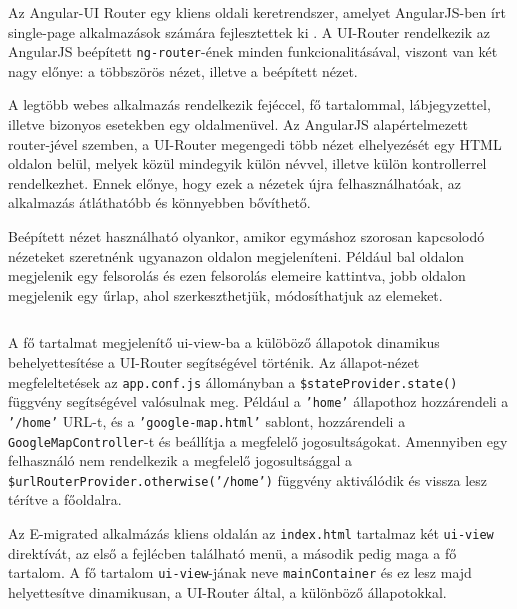 Az Angular-UI Router egy kliens oldali keretrendszer, amelyet AngularJS-ben írt single-page alkalmazások számára fejlesztettek ki \cite{uirouter}. A UI-Router rendelkezik az AngularJS beépített \texttt{ng-router}-ének minden funkcionalitásával, viszont van két nagy előnye: a többszörös nézet, illetve a beépített nézet. 

A legtöbb webes alkalmazás rendelkezik  fejéccel, fő tartalommal, lábjegyzettel, illetve bizonyos esetekben egy oldalmenüvel. Az AngularJS alapértelmezett router-jével szemben, a UI-Router megengedi több nézet elhelyezését egy HTML oldalon belül, melyek közül mindegyik külön névvel, illetve külön kontrollerrel rendelkezhet. Ennek előnye, hogy ezek a nézetek újra felhasználhatóak, az alkalmazás átláthatóbb és könnyebben bővíthető. 

Beépített nézet használható olyankor, amikor egymáshoz szorosan kapcsolodó nézeteket szeretnénk ugyanazon oldalon megjeleníteni. Például bal oldalon megjelenik egy felsorolás és ezen felsorolás elemeire kattintva, jobb oldalon megjelenik egy űrlap, ahol szerkeszthetjük, módosíthatjuk az elemeket.

\begin{listing}
  \inputminted[fontsize=\small]{js}{progfiles/app.conf.js}
  \caption{A fő tartalmat megjelenítő ui-view-ba a külöböző állapotok dinamikus behelyettesítése a UI-Router segítségével történik. Az állapot-nézet megfeleltetések az \texttt{app.conf.js} állományban a \texttt{\$stateProvider.state()} függvény segítségével valósulnak meg.  Például a \texttt{'home'} állapothoz hozzárendeli a \texttt{'/home'} URL-t, és a \texttt{'google-map.html'} sablont, hozzárendeli a \texttt{GoogleMapController}-t és beállítja a megfelelő jogosultságokat. Amennyiben egy felhasználó nem rendelkezik a megfelelő jogosultsággal a \texttt{\$urlRouterProvider.otherwise('/home')} függvény aktiválódik és vissza lesz térítve a főoldalra. }
  \label{lst:appconf}
\end{listing}



Az E-migrated alkalmázás kliens oldalán az \texttt{index.html} tartalmaz két \texttt{ui-view} direktívát, az első a fejlécben található menü, a második pedig maga a fő tartalom. A fő tartalom \texttt{ui-view}-jának neve \texttt{mainContainer} és ez lesz majd helyettesítve dinamikusan, a UI-Router által, a különböző állapotokkal. 


